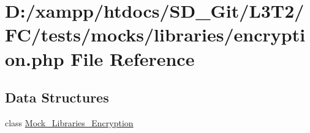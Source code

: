 \hypertarget{tests_2mocks_2libraries_2_encryption_8php}{}\section{D\+:/xampp/htdocs/\+S\+D\+\_\+\+Git/\+L3\+T2/\+F\+C/tests/mocks/libraries/encryption.php File Reference}
\label{tests_2mocks_2libraries_2_encryption_8php}
\subsection*{Data Structures}
\begin{DoxyCompactItemize}
\item 
class \hyperlink{class_mock___libraries___encryption}{Mock\+\_\+\+Libraries\+\_\+\+Encryption}
\end{DoxyCompactItemize}
